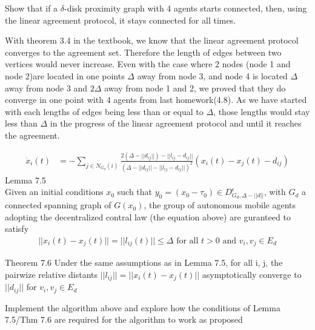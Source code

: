 \documentclass{article}
\begin{document}
\newpage
\begin{problem}
Show that if a $\delta$-disk proximity graph with 4 agents starts connected, then, using the linear agreement protocol, it stays connected for all times.

With theorem 3.4  in the textbook, we know that the linear agreement protocol converges to the agreement set. Therefore the length of edges between two vertices would never increase. Even with the case where 2 nodes (node 1 and node 2)are located in one points $\Delta$ away from node 3, and node 4 is located $\Delta$ away from node 3 and $2 \Delta$ away from node 1 and 2, we proved that they do converge in one point with 4 agents from last homework(4.8). As we have started with each lengths of edges being less than or equal to $\Delta$, those lengths would stay less than $\Delta$ in the progress of the linear agreement protocol and until it reaches the agreement. 


\end{problem}
\begin{problem}
    \begin{align*}
        \dot x_i(t) &= -\sum_{j \in N_{G_d}(i)} \frac{2(\Delta - ||d_{ij}||) - ||l_{ij} - d_{ij}||}{(\Delta - ||d_{ij}|| - ||l_{ij} - d_{ij}||)^2} (x_i(t) - x_j(t) - d_{ij} )
    \end{align*}
    Lemma 7.5\\
    Given an initial conditions $x_0$ such that $y_0 = (x_0 - \tau_0) \in D_{G_{d}, \Delta -||d||}^\epsilon$, with $G_d$ a connected spanning graph of $G(x_0)$, the group of autonomous mobile agents adopting the decentralized contral law (the equation above) are guranteed to satisfy
    \begin{align*}
        ||x_i(t) - x_j(t)|| = ||l_{ij}(t)|| \leq \Delta \text{ for all } t > 0 \text{ and }{ v_i, v_j} \in E_d
    \end{align*}

    Theorem 7.6
    Under the same assumptions as in Lemma 7.5, for all i, j, the pairwize relative distants $||l_{ij}|| = ||x_i(t) - x_j(t)||$ asymptotically converge to $||d_{ij}||$ for ${v_i, v_j} \in E_d$
    
    \vspace{12pt}
    Implement the algorithm above and explore how the conditions of Lemma 7.5/Thm 7.6 are required for the algorithm to work as proposed    
\end{problem}
    
\end{document}
